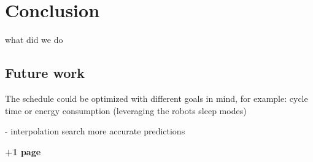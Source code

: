 \chapter{Conclusion}
\label{ch:conclusion}
\graphicspath{{chapters/Conclusion/}}

what did we do

\section{Future work}

The schedule could be optimized with different goals in mind, for example: cycle time or energy consumption (leveraging the robots sleep modes)

\cite{EnergyOptimisationBukata}

- interpolation search more accurate predictions

\textbf{+1 page}
